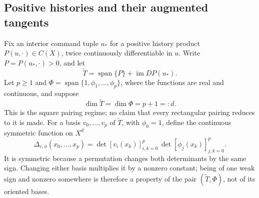 \documentclass[11pt]{amsart}
\theoremstyle{definition}\newtheorem{definition}[theorem]{Definition}
\theoremstyle{remark}\newtheorem{remark}[theorem]{Remark}
\begin{document}
\subsection{Positive histories and their augmented tangents}
Fix an interior command tuple $u_*$ for a positive history product
$P(u,\cdot)\in C(X)$, twice continuously differentiable in $u$. Write
$P=P(u_*,\cdot)>0$, and let
\begin{equation}\label{eq:v18-augmented-tangent}
 \widetilde T=\operatorname{span}\{P\}+\operatorname{im}DP(u_*).
\end{equation}
Let $p\ge1$ and $\Phi=\operatorname{span}\{1,\phi_1,\ldots,\phi_p\}$, where the
functions are real and continuous, and suppose
\begin{equation}\label{eq:v18-square-pair}
 \dim\widetilde T=\dim\Phi=p+1=:d.
\end{equation}
This is the square pairing regime; no claim that every rectangular
pairing reduces to it is made. For a basis $v_0,\ldots,v_p$ of
$\widetilde T$, with $\phi_0=1$, define the continuous symmetric
function on $X^d$
\begin{equation}\label{eq:v18-sign-kernel}
 \Delta_{v,\phi}(x_0,\ldots,x_p)
 =\det[v_i(x_k)]_{i,k=0}^p\,
  \det[\phi_j(x_k)]_{j,k=0}^p.
\end{equation}
It is symmetric because a permutation changes both determinants by the
same sign. Changing either basis multiplies it by a nonzero constant;
being of one weak sign and nonzero somewhere is therefore a property of
the pair $(\widetilde T,\Phi)$, not of its oriented bases.
\end{document}
